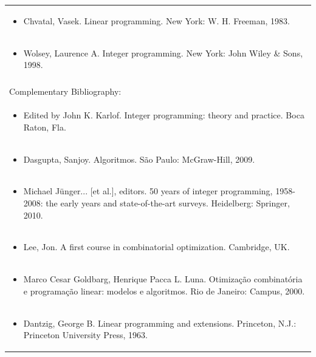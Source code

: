 \documentclass[11pt]{article}
\begin{document}
\begin{center}
\begin{longtable}{|p{4cm}|p{4cm}|p{4cm}|p{4cm}|}
\multicolumn{4}{|p{\dimexpr 16cm + 6\tabcolsep\relax}|}{\begin{itemize}\item Chvatal, Vasek. Linear programming. New York: W. H. Freeman, 1983.\end{itemize}}\\
\multicolumn{4}{|p{\dimexpr 16cm + 6\tabcolsep\relax}|}{\begin{itemize}\item Wolsey, Laurence A. Integer programming. New York: John Wiley \& Sons, 1998.\end{itemize}}\\
\multicolumn{4}{|p{16cm}|}{}\\
\hline
\multicolumn{4}{|p{16cm}|}{Complementary Bibliography:}\\*
\multicolumn{4}{|p{\dimexpr 16cm + 6\tabcolsep\relax}|}{\begin{itemize}\item Edited by John K. Karlof. Integer programming: theory and practice. Boca Raton, Fla.\end{itemize}}\\
\multicolumn{4}{|p{\dimexpr 16cm + 6\tabcolsep\relax}|}{\begin{itemize}\item Dasgupta, Sanjoy. Algoritmos. São Paulo: McGraw-Hill, 2009.\end{itemize}}\\
\multicolumn{4}{|p{\dimexpr 16cm + 6\tabcolsep\relax}|}{\begin{itemize}\item Michael Jünger... [et al.], editors. 50 years of integer programming, 1958-2008: the early years and state-of-the-art surveys. Heidelberg: Springer, 2010.\end{itemize}}\\
\multicolumn{4}{|p{\dimexpr 16cm + 6\tabcolsep\relax}|}{\begin{itemize}\item Lee, Jon. A first course in combinatorial optimization. Cambridge, UK.\end{itemize}}\\
\multicolumn{4}{|p{\dimexpr 16cm + 6\tabcolsep\relax}|}{\begin{itemize}\item Marco Cesar Goldbarg, Henrique Pacca L. Luna. Otimização combinatória e programação linear: modelos e algoritmos. Rio de Janeiro: Campus, 2000.\end{itemize}}\\
\multicolumn{4}{|p{\dimexpr 16cm + 6\tabcolsep\relax}|}{\begin{itemize}\item Dantzig, George B. Linear programming and extensions. Princeton, N.J.: Princeton University Press, 1963.\end{itemize}}\\
\hline
\end{longtable}
\end{center}
\end{document}
